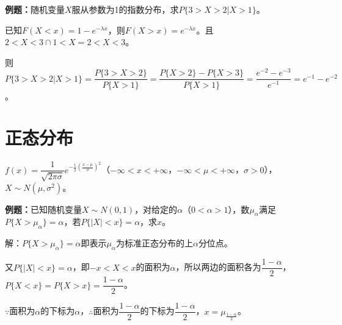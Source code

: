 \documentclass[UTF8, 12pt]{ctexart}
\begin{document}
\textbf{例题：}随机变量$X$服从参数为1的指数分布，求$P\{3>X>2|X>1\}$。

已知$F(X<x)=1-e^{-\lambda x}$，则$F(X>x)=e^{-\lambda x}$。且$2<X<3\cap 1<X=2<X<3$。

则$P\{3>X>2|X>1\}=\dfrac{P\{3>X>2\}}{P\{X>1\}}=\dfrac{P\{X>2\}-P\{X>3\}}{P\{X>1\}}=\dfrac{e^{-2}-e^{-3}}{e^{-1}}=e^{-1}-e^{-2}$。

\section{正态分布}

$f(x)=\dfrac{1}{\sqrt{2\pi\sigma}}e^{-\frac{1}{2}(\frac{x-\mu}{\sigma})^2}$（$-\infty<x<+\infty$，$-\infty<\mu<+\infty$，$\sigma>0$），$X\sim N(\mu,\sigma^2)$。

\textbf{例题：}已知随机变量$X\sim N(0,1)$，对给定的$\alpha$（$0<\alpha>1$），数$\mu_\alpha$满足$P\{X>\mu_\alpha\}=\alpha$，若$P\{\vert X\vert<x\}=\alpha$，求$x$。

解：$P\{X>\mu_\alpha\}=\alpha$即表示$\mu_\alpha$为标准正态分布的上$\alpha$分位点。

又$P\{\vert X\vert<x\}=\alpha$，即$-x<X<x$的面积为$\alpha$，所以两边的面积各为$\dfrac{1-\alpha}{2}$，$P\{X<x\}=P\{X>x\}=\dfrac{1-\alpha}{2}$。

$\because$面积为$\alpha$的下标为$\alpha$，$\therefore$面积为$\dfrac{1-\alpha}{2}$的下标为$\dfrac{1-\alpha}{2}$，$x=\mu_\frac{1-\alpha}{2}$。
\end{document}

